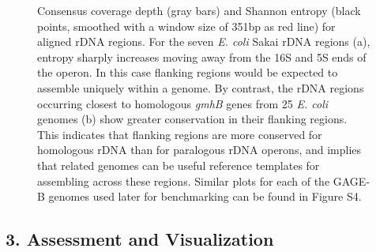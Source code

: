 \documentclass[a4,center,fleqn]{NAR}
\begin{document}
\begin{figure}[!t]
\begin{minipage}{.5\textwidth}
  \end{minipage}%

  \caption{
    Consensus coverage depth (gray bars) and Shannon entropy (black points, smoothed with a window size of 351bp as red line) for aligned rDNA regions. For the seven \textit{E. coli} Sakai rDNA regions (a), entropy sharply increases moving away from the 16S and 5S ends of the operon. In this case flanking regions would be expected to assemble uniquely within a genome. By contrast, the rDNA regions occurring closest to homologous \textit{gmhB} genes from 25 \textit{E. coli} genomes (b) show greater conservation in their flanking regions. This indicates that flanking regions are more conserved for homologous rDNA than for paralogous rDNA operons, and implies that related genomes can be useful reference templates for assembling across these regions. Similar plots for each of the GAGE-B genomes used later for benchmarking can be found in Figure S4.
  }
  \label{fig:entropy}
\end{figure}

\subsection*{3. Assessment and Visualization}
\end{document}
